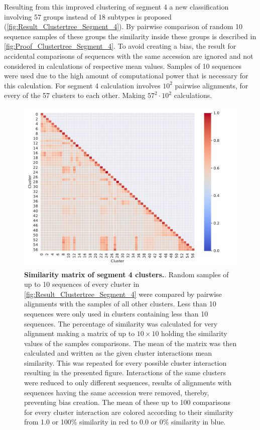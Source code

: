 \vspace{1em}

Resulting from this improved clustering of segment 4 a new classification involving 57 groups instead of 18 subtypes is proposed (\autoref{fig:Result_Clustertree_Segment_4}). By pairwise comparison of random 10 sequence samples of these groups the similarity inside these groups is described in \autoref{fig:Proof_Clustertree_Segment_4}. To avoid creating a bias, the result for accidental comparisons of sequences with the same accession are ignored and not considered in calculations of respective mean values. Samples of 10 sequences were used due to the high amount of computational power that is necessary for this calculation. For segment 4 calculation involves $10^2$ pairwise alignments, for every of the 57 clusters to each other. Making $57^2\cdot 10^2$ calculations.

\begin{figure}[!hbt]
    \centering
    \includegraphics[width=\textwidth]{Results/Cluster_Difference_Segment_4.pdf}
    \caption[Similarity matrix of segment 4 clusters]{\textbf{Similarity matrix of segment 4 clusters.}. Random samples of up to 10 sequences of every cluster in \autoref{fig:Result_Clustertree_Segment_4} were compared by pairwise alignments with the samples of all other clusters. Less than 10 sequences were only used in clusters containing less than 10 sequences. The percentage of similarity was calculated for very alignment making a matrix of up to $10\times10$ holding the similarity values of the samples comparisons. The mean of the matrix was then calculated and written as the given cluster interactions mean similarity. This was repeated for every possible cluster interaction resulting in the presented figure. Interactions of the same clusters were reduced to only different sequences, results of alignments with sequences having the same accession were removed, thereby, preventing bias creation. The mean of these up to 100 comparisons for every cluster interaction are colored according to their similarity from 1.0 or 100\% similarity in red to 0.0 or 0\% similarity in blue.}
    \label{fig:Proof_Clustertree_Segment_4}
\end{figure}

